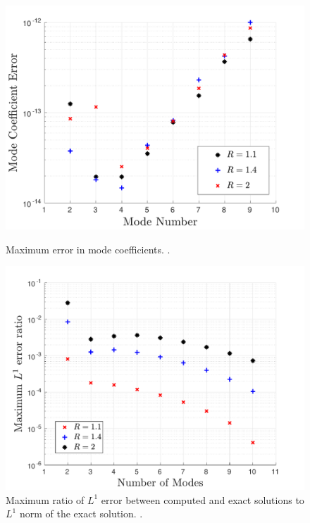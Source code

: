 \begin{figure}[ht]
\centerline{\includegraphics[width=0.9\linewidth]{06-appendix/SpectralMethodBoltzmann/Figures/keq_b_err.pdf}}
\caption{Maximum error in mode coefficients. .}\label{fig:keqbErr}
\centerline{\includegraphics[width=0.9\linewidth]{06-appendix/SpectralMethodBoltzmann/Figures/keq_L1_err.pdf}}
\caption{Maximum ratio of $L^1$ error between computed and exact solutions to $L^1$ norm of the exact solution. .}\label{fig:keqL1Err}
\end{figure}


